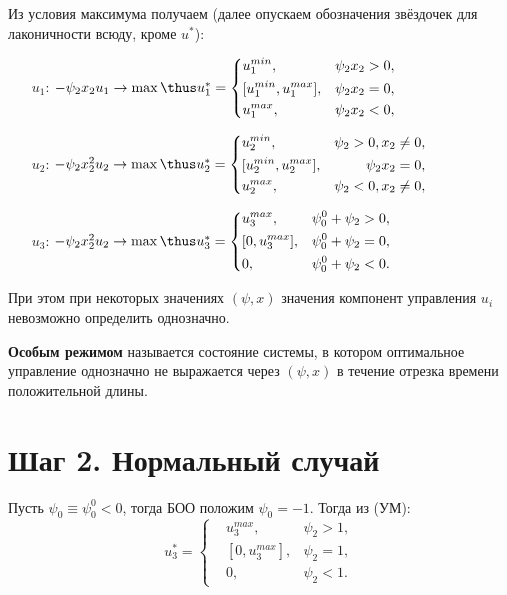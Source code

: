 Из условия максимума получаем (далее опускаем обозначения звёздочек для лаконичности всюду, кроме $u^*$):
\begin{enumerate}
    \item[$u_1$:] $-\psi_2 x_2 u_1 \to \max \thus u_1^* = \left\{ \begin{aligned}
        & u_1^{min}, &\psi_2 x_2 > 0, \\
        & [u_1^{min}, u_1^{max}], &\psi_2 x_2 = 0, \\
        & u_1^{max}, &\psi_2 x_2 < 0,
    \end{aligned} \right. $
    \item[$u_2$:] $-\psi_2 x_2^2 u_2 \to \max \thus u_2^* = \left\{ \begin{aligned}
        & u_2^{min}, &\psi_2 > 0, x_2 \neq 0, \\
        & [u_2^{min}, u_2^{max}], &\psi_2 x_2 = 0, \\
        & u_2^{max}, &\psi_2 < 0, x_2 \neq 0,
    \end{aligned} \right. $
    \item[$u_3$:] $-\psi_2 x_2^2 u_2 \to \max \thus u_3^* = \left\{ \begin{aligned}
        & u_3^{max}, &\psi_0^0 + \psi_2 > 0, \\
        & [0, u_3^{max}], &\psi_0^0 + \psi_2 = 0, \\
        & 0, &\psi_0^0 + \psi_2 < 0.
    \end{aligned} \right. $
\end{enumerate}
При этом при некоторых значениях $(\psi, x)$ значения компонент управления $u_i$ невозможно определить однозначно.

\begin{define}
    \textbf{Особым режимом} называется состояние системы, в котором оптимальное управление однозначно не выражается через $(\psi, x)$ в течение отрезка времени положительной длины.
\end{define}

\section*{Шаг 2. Нормальный случай}
Пусть $\psi_0 \equiv \psi_0^0 < 0$, тогда БОО положим $\psi_0 = -1$. Тогда из (УМ):
$$
    u_3^* = \left\{ \begin{aligned}
        & u_3^{max}, &\psi_2 > 1, \\
        & [0, u_3^{max}], &\psi_2 = 1, \\
        & 0, &\psi_2 < 1.
    \end{aligned} \right.
$$

